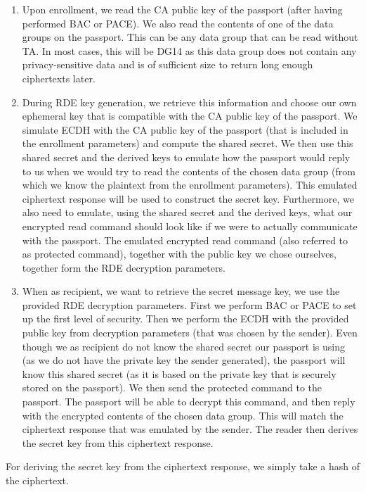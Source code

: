 \begin{enumerate}
    \item Upon enrollment, we read the CA public key of the passport (after having performed BAC or PACE).
    We also read the contents of one of the data groups on the passport.
    This can be any data group that can be read without TA.
    In most cases, this will be DG14 as this data group does not contain any privacy-sensitive data and is of sufficient size to return long enough ciphertexts later.
    \item During RDE key generation, we retrieve this information and choose our own ephemeral key that is compatible with the CA public key of the passport.
    We simulate ECDH with the CA public key of the passport (that is included in the enrollment parameters) and compute the shared secret.
    We then use this shared secret and the derived keys to emulate how the passport would reply to us when we would try to read the contents of the chosen data group (from which we know the plaintext from the enrollment parameters).
    This emulated ciphertext response will be used to construct the secret key.
    Furthermore, we also need to emulate, using the shared secret and the derived keys, what our encrypted read command should look like if we were to actually communicate with the passport.
    The emulated encrypted read command (also referred to as protected command), together with the public key we chose ourselves, together form the RDE decryption parameters.
    \item When as recipient, we want to retrieve the secret message key, we use the provided RDE decryption parameters.
    First we perform BAC or PACE to set up the first level of security.
    Then we perform the ECDH with the provided public key from decryption parameters (that was chosen by the sender).
    Even though we as recipient do not know the shared secret our passport is using (as we do not have the private key the sender generated), the passport will know this shared secret (as it is based on the private key that is securely stored on the passport).
    We then send the protected command to the passport.
    The passport will be able to decrypt this command, and then reply with the encrypted contents of the chosen data group.
    This will match the ciphertext response that was emulated by the sender.
    The reader then derives the secret key from this ciphertext response.
\end{enumerate}

For deriving the secret key from the ciphertext response, we simply take a hash of the ciphertext.

